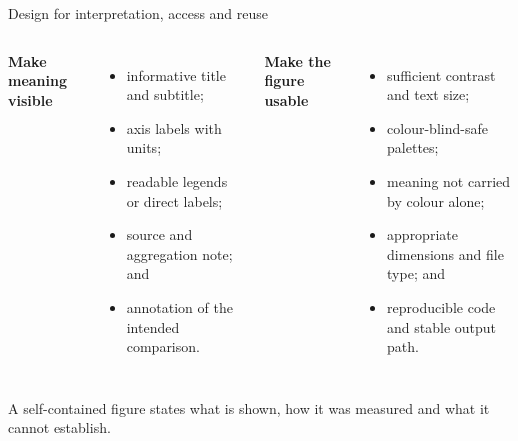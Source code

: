 \documentclass[10pt,aspectratio=169]{beamer}
\begin{document}
\begin{frame}{Design for interpretation, access and reuse}

\small

\begin{columns}[T]


\textbf{Make meaning visible}

\begin{itemize}
  \item informative title and subtitle;
  \item axis labels with units;
  \item readable legends or direct labels;
  \item source and aggregation note; and
  \item annotation of the intended comparison.
\end{itemize}


\textbf{Make the figure usable}

\begin{itemize}
  \item sufficient contrast and text size;
  \item colour-blind-safe palettes;
  \item meaning not carried by colour alone;
  \item appropriate dimensions and file type; and
  \item reproducible code and stable output path.
\end{itemize}

\end{columns}

\vspace{0.35cm}

\centering
\textcolor{ukudlaRed}{A self-contained figure states what is shown, how it was measured and what it cannot establish.}

\end{frame}
\end{document}
